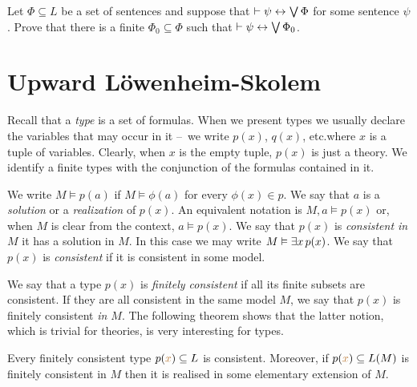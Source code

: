 \documentclass[creche.tex]{subfiles}
\begin{document}
\begin{exercise}
Let $\Phi\subseteq L$ be a set of sentences and suppose that $\vdash\psi\leftrightarrow\bigvee\Phi$ for some sentence $\psi$. Prove that there is a finite $\Phi_0\subseteq\Phi$ such that  $\vdash\psi\leftrightarrow\bigvee\Phi_0$.\QED
\end{exercise}


\section{Upward Löwenheim-Skolem}

\def\ceq#1#2#3{\parbox{13ex}{$\displaystyle #1$}\parbox{4ex}{\hfil$#2$}$\displaystyle #3$}
 
Recall that a \emph{type\/} is a set of formulas. When we present types we usually declare the variables that may occur in it --~we write \emph{$p(x)$}, \emph{$q(x)$}, etc.\@ where $x$ is a tuple of variables. Clearly, when $x$ is the empty tuple, $p(x)$ is just a theory. We identify a finite types with the conjunction of the formulas contained in it.

We write \emph{$M\models p(a)$} if $M\models\phi(a)$ for every $\phi(x)\in p$.  We say that $a$ is a \emph{solution\/} or a \emph{realization\/} of $p(x)$. An equivalent notation is \emph{$M,a\models p(x)$} or, when $M$ is clear from the context, \emph{$a\models p(x)$}. We say that $p(x)$ is \emph{consistent in $M$\/} it has a solution in $M$. In this case we may write \emph{$M\vDash\exists x\,p(x)$}.  We say that $p(x)$ is \emph{consistent\/} if it is consistent in some model.

We say that a type $p(x)$ is \emph{finitely consistent\/} if all its finite subsets are consistent. If they are all consistent in the same model $M$, we say that $p(x)$ is finitely consistent \emph{in $M$}. The following theorem shows that the latter notion, which is trivial for theories, is very interesting for types.

\begin{void_thm}\label{thm_compattezzatipi}
Every finitely consistent type $p({\color{brown} x})\subseteq L$ is consistent. Moreover, if $p({\color{brown} x})\subseteq L(M)$ is finitely consistent in $M$ then it is realised in some elementary extension of $M$.
\end{void_thm}
\end{document}
